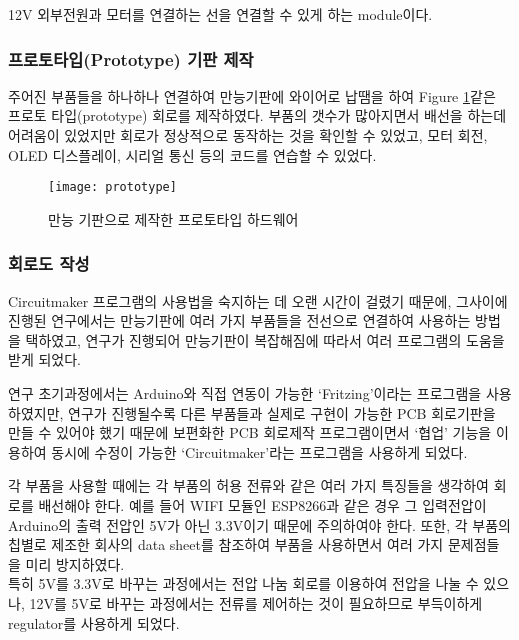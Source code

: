 \begin{description}[font=$\bullet$~\normalfont\scshape\color{red!50!black}]
	\item [TE Connectivity/AMP 5525258-3 및 Wurth Elektronik 694106301002] 12V 외부전원과 모터를 연결하는 선을 연결할 수 있게 하는 module이다.
\end{description}

\subsubsection{프로토타입(Prototype) 기판 제작}

주어진 부품들을 하나하나 연결하여 만능기판에 와이어로 납땜을 하여 Figure \ref{fig:prototype}\과 같은 프로토 타입(prototype) 회로를 제작하였다. 부품의 갯수가 많아지면서 배선을 하는데 어려움이 있었지만 회로가 정상적으로 동작하는 것을 확인할 수 있었고, 모터 회전, OLED 디스플레이, 시리얼 통신 등의 코드를 연습할 수 있었다.

\begin{figure}[h]
	\begin{center}
		\texttt{[image: prototype]} 
		\caption{만능 기판으로 제작한 프로토타입 하드웨어}
		\label{fig:prototype}
	\end{center}
\end{figure}


\subsubsection{회로도 작성}

Circuitmaker 프로그램의 사용법을 숙지하는 데 오랜 시간이 걸렸기 때문에, 그사이에 진행된 연구에서는 만능기판에 여러 가지 부품들을 전선으로 연결하여 사용하는 방법을 택하였고, 연구가 진행되어 만능기판이 복잡해짐에 따라서 여러 프로그램의 도움을 받게 되었다.

연구 초기과정에서는 Arduino와 직접 연동이 가능한 ‘Fritzing’이라는 프로그램을 사용하였지만, 연구가 진행될수록 다른 부품들과 실제로 구현이 가능한 PCB 회로기판을 만들 수 있어야 했기 때문에 보편화한 PCB 회로제작 프로그램이면서 ‘협업’ 기능을 이용하여 동시에 수정이 가능한 ‘Circuitmaker’라는 프로그램을 사용하게 되었다.

각 부품을 사용할 때에는 각 부품의 허용 전류와 같은 여러 가지 특징들을 생각하여 회로를 배선해야 한다. 예를 들어 WIFI 모듈인 ESP8266과 같은 경우 그 입력전압이 Arduino의 출력 전압인 5V가 아닌 3.3V이기 때문에 주의하여야 한다. 또한, 각 부품의 칩별로 제조한 회사의 data sheet를 참조하여 부품을 사용하면서 여러 가지 문제점들을 미리 방지하였다.\\
특히 5V를 3.3V로 바꾸는 과정에서는 전압 나눔 회로를 이용하여 전압을 나눌 수 있으나, 12V를 5V로 바꾸는 과정에서는 전류를 제어하는 것이 필요하므로 부득이하게 regulator를 사용하게 되었다.


